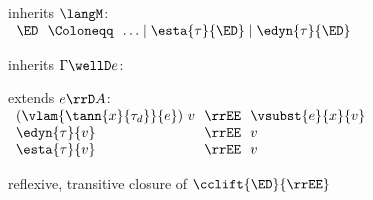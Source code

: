 \begin{flushleft}

 inherits $\langM$:\\
$\begin{array}{l@{~~}c@{~~}l}
  \ED & \Coloneqq & \ldots \mid \esta{\tau}{\ED} \mid \edyn{\tau}{\ED}
\end{array}$

\medskip
{} inherits $\Gamma \wellD e$:
\begin{mathpar}


\end{mathpar}

\medskip
{} extends $e \rrD A$:\\
$\begin{array}{l@{~~}c@{~~}l}
  (\vlam{\tann{x}{\tau_d}}{e})~v & \rrEE & \vsubst{e}{x}{v}
\\
  \edyn{\tau}{v} & \rrEE & v
\\
  \esta{\tau}{v} & \rrEE & v
\end{array}$

\medskip
{} reflexive, transitive closure of $\cclift{\ED}{\rrEE}$

\end{flushleft}
